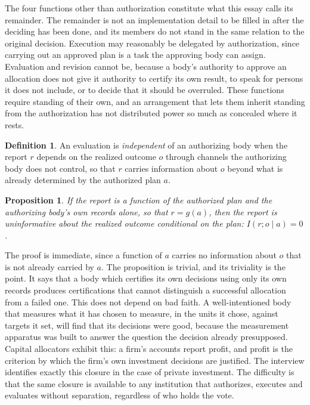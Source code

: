 \documentclass[12pt]{article}
\newtheorem{proposition}{Proposition}
\theoremstyle{definition}
\newtheorem{definition}{Definition}
\begin{document}
The four functions other than authorization constitute what this essay calls its remainder. The remainder is not an implementation detail to be filled in after the deciding has been done, and its members do not stand in the same relation to the original decision. Execution may reasonably be delegated by authorization, since carrying out an approved plan is a task the approving body can assign. Evaluation and revision cannot be, because a body's authority to approve an allocation does not give it authority to certify its own result, to speak for persons it does not include, or to decide that it should be overruled. These functions require standing of their own, and an arrangement that lets them inherit standing from the authorization has not distributed power so much as concealed where it rests.

\begin{definition}
An evaluation is \emph{independent} of an authorizing body when the report $r$ depends on the realized outcome $o$ through channels the authorizing body does not control, so that $r$ carries information about $o$ beyond what is already determined by the authorized plan $a$.
\end{definition}

\begin{proposition}\label{prop:self}
If the report is a function of the authorized plan and the authorizing body's own records alone, so that $r=g(a)$, then the report is uninformative about the realized outcome conditional on the plan: $I(r;o\mid a)=0$.
\end{proposition}

The proof is immediate, since a function of $a$ carries no information about $o$ that is not already carried by $a$. The proposition is trivial, and its triviality is the point. It says that a body which certifies its own decisions using only its own records produces certifications that cannot distinguish a successful allocation from a failed one. This does not depend on bad faith. A well-intentioned body that measures what it has chosen to measure, in the units it chose, against targets it set, will find that its decisions were good, because the measurement apparatus was built to answer the question the decision already presupposed. Capital allocators exhibit this: a firm's accounts report profit, and profit is the criterion by which the firm's own investment decisions are justified. The interview identifies exactly this closure in the case of private investment. The difficulty is that the same closure is available to any institution that authorizes, executes and evaluates without separation, regardless of who holds the vote.
\end{document}
